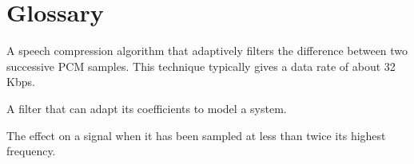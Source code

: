\chapter{Glossary}

\begin{description}

A speech compression algorithm that adaptively filters the difference between
two successive PCM samples. This technique typically gives a data rate
of about 32 Kbps.

A filter that can adapt its coefficients to model a
system.

The effect on a signal when it has been sampled at
less than twice its highest frequency.

\end{description}